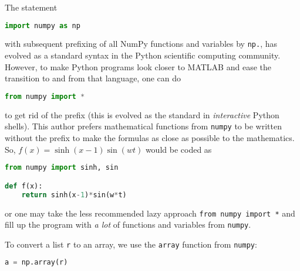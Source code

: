 \documentclass[graybox,sectrefs,envcountresetchap,open=right,final]{svmonodo}
\newenvironment{notice_mdfboxadmon}[1][]{
\begin{notice_mdfboxmdframed}[frametitle=#1]
}
{
\end{notice_mdfboxmdframed}
}
\begin{document}
\begin{notice_mdfboxadmon}
The statement



\begin{lstlisting}[language=Python,style=simple,xleftmargin=2mm]
import numpy as np

\end{lstlisting}

with subsequent prefixing of all NumPy functions and variables by \texttt{np.},
has evolved as a standard syntax in the Python scientific computing
community. However, to make Python programs look closer to MATLAB
and ease the transition to and from that language, one can do



\begin{lstlisting}[language=Python,style=simple,xleftmargin=2mm]
from numpy import *

\end{lstlisting}

to get rid of the prefix (this is evolved as the standard in
\emph{interactive} Python shells). This author prefers mathematical
functions from \texttt{numpy} to be written without the prefix to
make the formulas as close as possible to the mathematics.
So, $f(x)=\sinh(x-1)\sin(w t)$ would be coded as






\begin{lstlisting}[language=Python,style=simple,xleftmargin=2mm]
from numpy import sinh, sin

def f(x):
    return sinh(x-1)*sin(w*t)

\end{lstlisting}

or one may take the less recommended
lazy approach \texttt{from numpy import *} and fill up
the program with \emph{a lot} of functions and variables from \texttt{numpy}.
\end{notice_mdfboxadmon} %



To convert a list \texttt{r} to an array,
we use the \texttt{array} function
from \texttt{numpy}:



\begin{lstlisting}[language=Python,style=simple,xleftmargin=2mm]
a = np.array(r)

\end{lstlisting}
\end{document}
